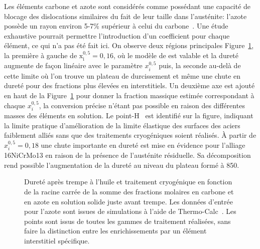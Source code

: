 Les éléments carbone et azote sont considérés comme possédant une capacité de blocage des dislocations similaires du fait de leur taille dans l'austénite: l'azote possède un rayon environ 5-7\% supérieur à celui du carbone~\cite{Yahia1995}. Une étude exhaustive pourrait permettre l'introduction d'un coefficient pour chaque élément, ce qui n'a pas été fait ici. On observe deux régions principales Figure~\ref{fig:hardness_norstrom}, la première à gauche de $\mathrm{x_{i}^{0,5}=0,16}$, où le modèle de \citet{Norstrom1976} est valable et la dureté augmente de façon linéaire avec le paramètre $x_{i}^{0,5}$ puis, la seconde au-delà de cette limite où l'on trouve un plateau de durcissement et même une chute en dureté pour des fractions plus élevées en interstitiels. Un deuxième axe est ajouté en haut de la Figure~\ref{fig:hardness_norstrom} pour donner la fraction massique estimée correspondant à chaque $x_{i}^{0,5}$, la conversion précise n'étant pas possible en raison des différentes masses des éléments en solution. Le point-H~\cite{Sherby2008} est identifié sur la figure, indiquant la limite pratique d'amélioration de la limite élastique des surfaces des aciers faiblement alliés sans que des traitements cryogéniques soient réalisés. À partir de $x_{i}^{0,5}=0,18$ une chute importante en dureté est mise en évidence pour l'alliage 16NiCrMo13 en raison de la présence de l'austénite résiduelle. Sa décomposition rend possible l'augmentation de la dureté au niveau du plateau formé à \SI{850}{\HV}. 

\begin{figure}[h]
  \centering
  
  \caption{\label{fig:hardness_norstrom}Dureté après trempe à l'huile et traitement cryogénique en fonction de la racine carrée de la somme des fractions molaires en carbone et en azote en solution solide juste avant trempe.  Les données d'entrée pour l'azote sont issues de simulations à l'aide de Thermo-Calc~\cite{Andersson2002,Borgenstam2000}. Les points sont issus de toutes les gammes de traitement réalisées, sans faire la distinction entre les enrichissements par un élément interstitiel spécifique.}
\end{figure}

